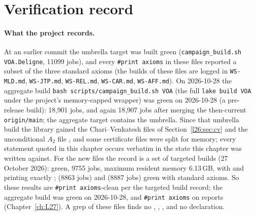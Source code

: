 \section{Verification record}\label{l26:sec:verification}

\paragraph{What the project records.} At an earlier commit the umbrella target  was built green
(\texttt{campaign\_build.sh VOA.Deligne}, 11099 jobs), and every \texttt{\#print axioms} in these files reported a subset of the
three standard axioms (the builds of these files are logged in \texttt{WS-MLD.md},
\texttt{WS-JTP.md}, \texttt{WS-REL.md}, \texttt{WS-CAR.md}, \texttt{WS-AFF.md}). On 2026-10-28 the aggregate build \texttt{bash scripts/campaign\_build.sh VOA} (the full \texttt{lake build VOA} under the project's memory-capped wrapper) was green on 2026-10-28 (a pre-release build): 18{,}901 jobs, and again 18{,}907 jobs after merging the then-current \texttt{origin/main}; the aggregate target contains the umbrella. Since that umbrella build the library gained the Chari--Venkatesh files of
Section~\ref{l26:sec:cv} and the unconditional $A_2$ file , and some certificate
files were split for memory; every statement quoted in this chapter occurs verbatim in the state this chapter was written against. For the new files the
record is a set of targeted builds (27 October 2026):  green, 9755 jobs,
maximum resident memory 6.13\,GB, with  and  printing exactly
;  (8863 jobs) and
 (8887 jobs) green with standard axioms. So these results are
\texttt{\#print axioms}-clean per the targeted build record; the aggregate build was green on 2026-10-28, and
\texttt{\#print axioms} on  reports  (Chapter~\ref{ch:L27}). A grep of these
files finds no , , ,  and no  declaration.

